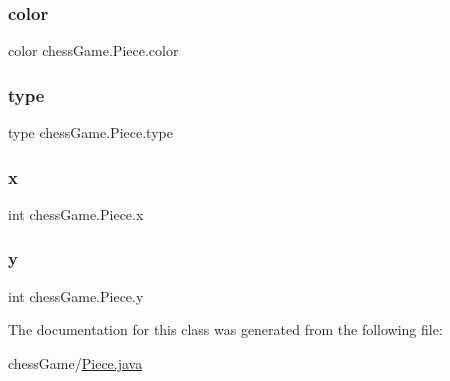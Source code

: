 \hypertarget{classchess_game_1_1_piece_ad5117cbbbaebf3a27c4f3c2bcbd6678b}{}\label{classchess_game_1_1_piece_ad5117cbbbaebf3a27c4f3c2bcbd6678b} 
\subsubsection{\texorpdfstring{color}{color}}
{\footnotesize\ttfamily color chess\+Game.\+Piece.\+color\hspace{0.3cm}{\ttfamily [private]}}

\hypertarget{classchess_game_1_1_piece_a1370c7f61581a1b72fa8ac2fd1af70a2}{}\label{classchess_game_1_1_piece_a1370c7f61581a1b72fa8ac2fd1af70a2} 
\subsubsection{\texorpdfstring{type}{type}}
{\footnotesize\ttfamily type chess\+Game.\+Piece.\+type\hspace{0.3cm}{\ttfamily [private]}}

\hypertarget{classchess_game_1_1_piece_aeb2d3374492005d799aa6b7b85be40e7}{}\label{classchess_game_1_1_piece_aeb2d3374492005d799aa6b7b85be40e7} 
\subsubsection{\texorpdfstring{x}{x}}
{\footnotesize\ttfamily int chess\+Game.\+Piece.\+x\hspace{0.3cm}{\ttfamily [private]}}

\hypertarget{classchess_game_1_1_piece_a56e4d8d18eca3fd03a6bd5d6112d6359}{}\label{classchess_game_1_1_piece_a56e4d8d18eca3fd03a6bd5d6112d6359} 
\subsubsection{\texorpdfstring{y}{y}}
{\footnotesize\ttfamily int chess\+Game.\+Piece.\+y\hspace{0.3cm}{\ttfamily [private]}}



The documentation for this class was generated from the following file\+:\begin{DoxyCompactItemize}
\item 
chess\+Game/\hyperlink{_piece_8java}{Piece.\+java}\end{DoxyCompactItemize}
